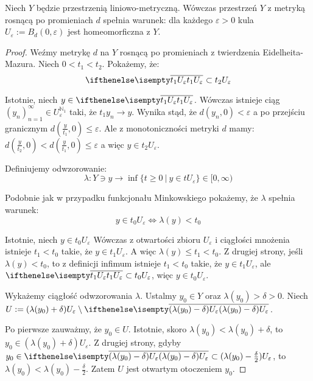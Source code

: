 \begin{lem} \label{lem:ball-homeomorphism}
  Niech $Y$ będzie przestrzenią liniowo-metryczną. Wówczas przestrzeń $Y$ z metryką rosnącą po promieniach $d$ spełnia warunek: dla każdego $\varepsilon > 0$ kula $U_\varepsilon := B_d(0, \varepsilon)$ jest homeomorficzna z $Y$.
  
  \begin{proof}
    Weźmy metrykę $d$ na $Y$ rosnącą po promieniach z twierdzenia Eidelheita-Mazura. Niech $0 < t_1 < t_2$. Pokażemy, że:
    \[
      \cl{t_1 U_\varepsilon} \subset t_2 U_\varepsilon
    \]
    
    Istotnie, niech $y \in \cl{t_1 U_\varepsilon}$. Wówczas istnieje ciąg $(y_n)_{n=1}^\infty \in U_\varepsilon^{\mathbb{N}_1}$ taki, że $t_1 y_n \to y$. Wynika stąd, że $d(y_n, 0) < \varepsilon$ a po przejściu granicznym $d(\frac{y}{t_1}, 0) \leq \varepsilon$. Ale z monotoniczności metryki $d$ mamy: $d(\frac{y}{t_2}, 0) < d(\frac{y}{t_1}, 0) \leq \varepsilon$ a więc $y \in t_2 U_\varepsilon$.
    
    Definiujemy odwzorowanie:
    \[
      \lambda: Y \ni y \to \inf \{t \geq 0\ |\ y \in t U_\varepsilon\} \in [0, \infty)
    \]
    
    Podobnie jak w przypadku funkcjonału Minkowskiego pokażemy, że $\lambda$ spełnia warunek:
    \[
      y \in t_0 U_\varepsilon \iff \lambda(y) < t_0
    \]
    
    Istotnie, niech $y \in t_0 U_\varepsilon$
    Wówczas z otwartości zbioru $U_\varepsilon$ i ciągłości mnożenia istnieje $t_1 < t_0$ takie, że $y \in t_1 U_\varepsilon$.
    A więc $\lambda(y) \leq t_1 < t_0$.
    Z drugiej strony, jeśli $\lambda(y) < t_0$, to z definicji infimum istnieje $t_1 < t_0$ takie, że $y \in t_1 U_\varepsilon$, ale $\cl{t_1 U_\varepsilon} \subset t_0 U_\varepsilon$, więc $y \in t_0 U_\varepsilon$.

    Wykażemy ciągłość odwzorowania $\lambda$.
    Ustalmy $y_0 \in Y$ oraz $\lambda(y_0) > \delta > 0$.
    Niech $U := (\lambda(y_0) + \delta) U_\varepsilon \setminus \cl{(\lambda(y_0)-\delta) U_\varepsilon}$.
    
    Po pierwsze zauważmy, że $y_0 \in U$.
    Istotnie, skoro $\lambda(y_0) < \lambda(y_0) + \delta$, to $y_0 \in (\lambda(y_0) + \delta) U_\varepsilon$.
    Z drugiej strony, gdyby $y_0 \in \cl{(\lambda(y_0) - \delta) U_\varepsilon} \subset (\lambda(y_0) - \frac{\delta}{2}) U_\varepsilon$, to $\lambda(y_0) < \lambda(y_0) - \frac{\delta}{2}$.
    Zatem $U$ jest otwartym otoczeniem $y_0$.
    

\end{proof}
\end{lem}

